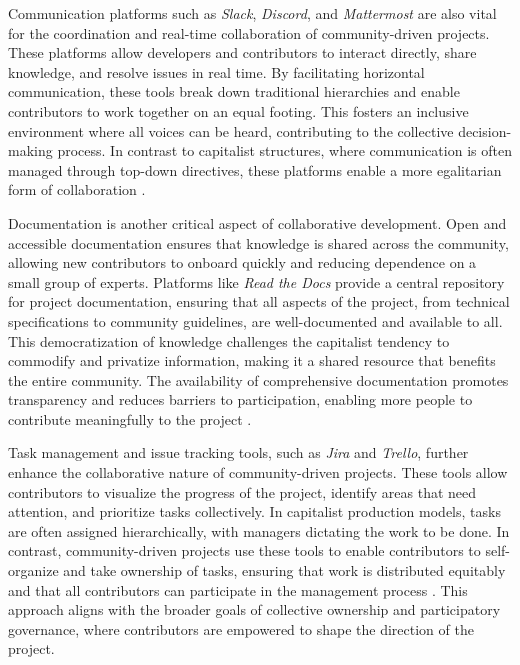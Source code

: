 \begin{refsection}
Communication platforms such as \textit{Slack}, \textit{Discord}, and \textit{Mattermost} are also vital for the coordination and real-time collaboration of community-driven projects. These platforms allow developers and contributors to interact directly, share knowledge, and resolve issues in real time. By facilitating horizontal communication, these tools break down traditional hierarchies and enable contributors to work together on an equal footing. This fosters an inclusive environment where all voices can be heard, contributing to the collective decision-making process. In contrast to capitalist structures, where communication is often managed through top-down directives, these platforms enable a more egalitarian form of collaboration \cite[pp.~90-93]{schweik2018}.

Documentation is another critical aspect of collaborative development. Open and accessible documentation ensures that knowledge is shared across the community, allowing new contributors to onboard quickly and reducing dependence on a small group of experts. Platforms like \textit{Read the Docs} provide a central repository for project documentation, ensuring that all aspects of the project, from technical specifications to community guidelines, are well-documented and available to all. This democratization of knowledge challenges the capitalist tendency to commodify and privatize information, making it a shared resource that benefits the entire community. The availability of comprehensive documentation promotes transparency and reduces barriers to participation, enabling more people to contribute meaningfully to the project \cite[pp.~98-101]{mcalevey2021}.

Task management and issue tracking tools, such as \textit{Jira} and \textit{Trello}, further enhance the collaborative nature of community-driven projects. These tools allow contributors to visualize the progress of the project, identify areas that need attention, and prioritize tasks collectively. In capitalist production models, tasks are often assigned hierarchically, with managers dictating the work to be done. In contrast, community-driven projects use these tools to enable contributors to self-organize and take ownership of tasks, ensuring that work is distributed equitably and that all contributors can participate in the management process \cite[pp.~90-93]{schweik2018}. This approach aligns with the broader goals of collective ownership and participatory governance, where contributors are empowered to shape the direction of the project.


\end{refsection}
